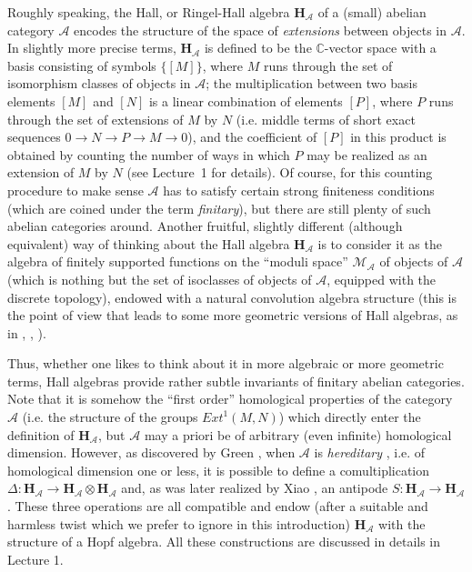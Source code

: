 \documentclass[a4paper,10pt]{amsart}
\def\H{\mathbf{H}}
\def\C{\mathbb{C}}
\numberwithin{equation}{section}
\begin{document}
Roughly speaking, the Hall, or Ringel-Hall algebra $\H_{\mathcal{A}}$ of a (small) abelian category $\mathcal{A}$ encodes the structure of the space of \textit{extensions} between objects in $\mathcal{A}$. In slightly more precise terms, $\H_{\mathcal{A}}$ is defined to be the $\C$-vector space with a basis consisting of symbols $\{[M]\}$, where $M$ runs through the set of isomorphism classes of objects in $\mathcal{A}$; the multiplication between two basis elements $[M]$ and $[N]$ is a linear combination of elements $[P]$, where $P$ runs through the set of extensions of $M$ by $N$ (i.e. middle terms of short exact sequences $0 \to N \to P \to M \to 0$), and the coefficient of $[P]$ in this product is obtained by counting the number of ways in which $P$ may be realized as an extension of $M$ by $N$ (see Lecture~1 for details). Of course, for this counting procedure to make sense $\mathcal{A}$ has to satisfy certain strong finiteness conditions (which are coined under the term \textit{finitary}), but there are still plenty of such abelian categories around. Another fruitful, slightly different (although equivalent) way of thinking about the Hall algebra $\H_{\mathcal{A}}$ is to consider it as the algebra of finitely supported functions on the ``moduli space'' $\mathcal{M}_{\mathcal{A}}$ of objects of $\mathcal{A}$ (which is nothing but the set of isoclasses of objects of $\mathcal{A}$, equipped with the discrete topology), endowed with a natural convolution algebra structure (this is the point of view that leads to some more geometric versions of Hall algebras, as in \cite{Lu1}, \cite{Lau}, \cite{Sinv}).

\vspace{.1in}

Thus, whether one likes to think about it in more algebraic or more geometric terms, Hall algebras provide rather subtle invariants of finitary abelian categories. Note that it is somehow the ``first order'' homological properties of the category $\mathcal{A}$ (i.e. the structure of the groups ${Ext}^1(M,N)$) which directly enter the definition of $\H_{\mathcal{A}}$, but $\mathcal{A}$ may a priori be of arbitrary (even infinite) homological dimension. However, as discovered by Green \cite{Green}, when $\mathcal{A}$ is \textit{hereditary} , i.e. of homological dimension one or less, it is possible to define a comultiplication $\Delta: \H_{\mathcal{A}} \to \H_{\mathcal{A}} \otimes \H_{\mathcal{A}}$ and, as was later realized by Xiao \cite{Xiao1}, an antipode $S: \H_{\mathcal{A}} \to \H_{\mathcal{A}}$. These three operations are all compatible and endow (after a suitable and harmless twist which we prefer to ignore in this introduction) $\H_{\mathcal{A}}$ with the structure of a Hopf algebra.  All these constructions are discussed in details in Lecture 1.
\end{document}

